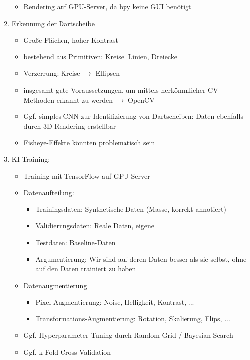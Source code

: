 \begin{enumerate}
\begin{itemize}
        \item Rendering auf GPU-Server, da bpy keine GUI benötigt
    \end{itemize}

    \item Erkennung der Dartscheibe
    \begin{itemize}
        \raggedright
        \item Große Flächen, hoher Kontrast
        \item bestehend aus Primitiven: Kreise, Linien, Dreiecke
        \item Verzerrung: Kreise $\rightarrow$ Ellipsen
        \item insgesamt gute Voraussetzungen, um mittels herkömmlicher CV-Methoden erkannt zu werden $\rightarrow$ OpenCV
        \item Ggf. simples CNN zur Identifizierung von Dartscheiben: Daten ebenfalls durch 3D-Rendering erstellbar
        \item Fisheye-Effekte könnten problematisch sein
    \end{itemize}

    \item KI-Training:
    \begin{itemize}
        \item Training mit TensorFlow auf GPU-Server
        \item Datenaufteilung:
        \begin{itemize}
            \item Trainingsdaten: Synthetische Daten (Masse, korrekt annotiert)
            \item Validierungsdaten: Reale Daten, eigene
            \item Testdaten: Baseline-Daten
            \item Argumentierung: Wir sind auf deren Daten besser als sie selbst, ohne auf den Daten trainiert zu haben
        \end{itemize}

        \item Datenaugmentierung
        \begin{itemize}
            \item Pixel-Augmentierung: Noise, Helligkeit, Kontrast, ...
            \item Transformations-Augmentierung: Rotation, Skalierung, Flips, ...
        \end{itemize}

        \item Ggf. Hyperparameter-Tuning durch Random Grid / Bayesian Search
        \item Ggf. k-Fold Cross-Validation
    \end{itemize}

\end{enumerate}
\fi
